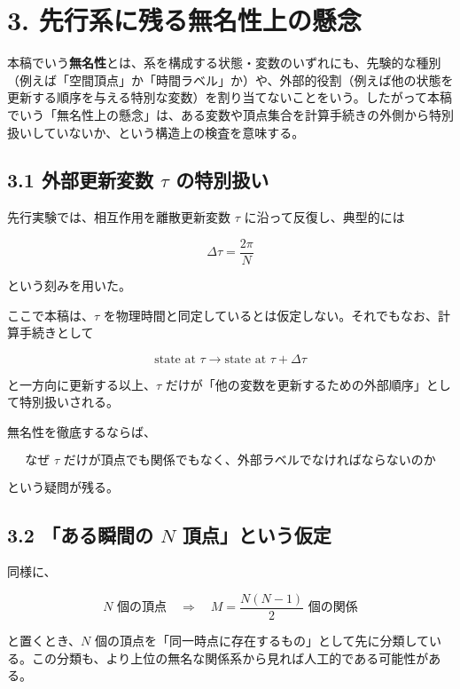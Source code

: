 \documentclass[
  a4paper,
]{ltjsarticle}
\begin{document}
\section{3.
先行系に残る無名性上の懸念}\label{ux5148ux884cux7cfbux306bux6b8bux308bux7121ux540dux6027ux4e0aux306eux61f8ux5ff5}

本稿でいう\textbf{無名性}とは、系を構成する状態・変数のいずれにも、先験的な種別（例えば「空間頂点」か「時間ラベル」か）や、外部的役割（例えば他の状態を更新する順序を与える特別な変数）を割り当てないことをいう。したがって本稿でいう「無名性上の懸念」は、ある変数や頂点集合を計算手続きの外側から特別扱いしていないか、という構造上の検査を意味する。

\subsection{\texorpdfstring{3.1 外部更新変数 \(\tau\)
の特別扱い}{3.1 外部更新変数 \textbackslash tau の特別扱い}}\label{ux5916ux90e8ux66f4ux65b0ux5909ux6570-tau-ux306eux7279ux5225ux6271ux3044}

先行実験では、相互作用を離散更新変数 \(\tau\) に沿って反復し、典型的には

\[
\Delta\tau
=
\frac{2\pi}{N}
\]

という刻みを用いた。

ここで本稿は、\(\tau\)
を物理時間と同定しているとは仮定しない。それでもなお、計算手続きとして

\[
\text{state at }\tau
\longrightarrow
\text{state at }\tau+\Delta\tau
\]

と一方向に更新する以上、\(\tau\)
だけが「他の変数を更新するための外部順序」として特別扱いされる。

無名性を徹底するならば、

\[
\boxed{
\text{なぜ }\tau\text{ だけが頂点でも関係でもなく、外部ラベルでなければならないのか}
}
\]

という疑問が残る。

\subsection{\texorpdfstring{3.2 「ある瞬間の \(N\)
頂点」という仮定}{3.2 「ある瞬間の N 頂点」という仮定}}\label{ux3042ux308bux77acux9593ux306e-n-ux9802ux70b9ux3068ux3044ux3046ux4eeeux5b9a}

同様に、

\[
N\text{ 個の頂点}
\quad\Longrightarrow\quad
M=\frac{N(N-1)}{2}\text{ 個の関係}
\]

と置くとき、\(N\)
個の頂点を「同一時点に存在するもの」として先に分類している。この分類も、より上位の無名な関係系から見れば人工的である可能性がある。
\end{document}

